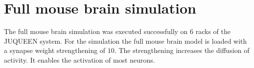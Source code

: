 \section{Full mouse brain simulation}
The full mouse brain simulation was executed successfully on $6$ racks of the JUQUEEN system.
For the simulation the full mouse brain model is loaded with a synapse weight strengthening of $10$.
The strengthening increases the diffusion of activity.
It enables the activation of most neurons.
\begin{figure}[ht!]
     \begin{center}
\end{center}
\end{figure}
